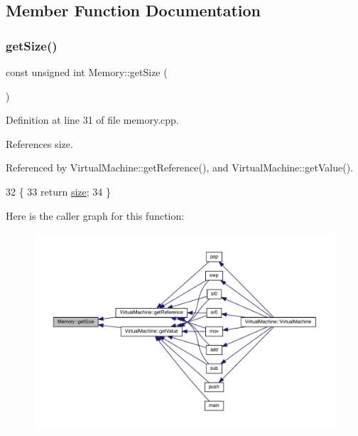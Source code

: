 \subsection{Member Function Documentation}
\mbox{\label{class_memory_a9687fde54e7c10c54060117045060613}} 
\subsubsection{\texorpdfstring{get\+Size()}{getSize()}}
{\footnotesize\ttfamily const unsigned int Memory\+::get\+Size (\begin{DoxyParamCaption}{ }\end{DoxyParamCaption})}



Definition at line 31 of file memory.\+cpp.



References size.



Referenced by Virtual\+Machine\+::get\+Reference(), and Virtual\+Machine\+::get\+Value().


\begin{DoxyCode}
32 \{
33     \textcolor{keywordflow}{return} \mbox{\hyperlink{class_memory_a97e5472d284e8daceeb740acb2170ae0}{size}};
34 \}
\end{DoxyCode}
Here is the caller graph for this function\+:
\nopagebreak
\begin{figure}[H]
\begin{center}
\leavevmode
\includegraphics[width=350pt]{class_memory_a9687fde54e7c10c54060117045060613_icgraph}
\end{center}
\end{figure}
\mbox{\label{class_memory_ab669beeca09308c880af9b13cde7f655}} 
